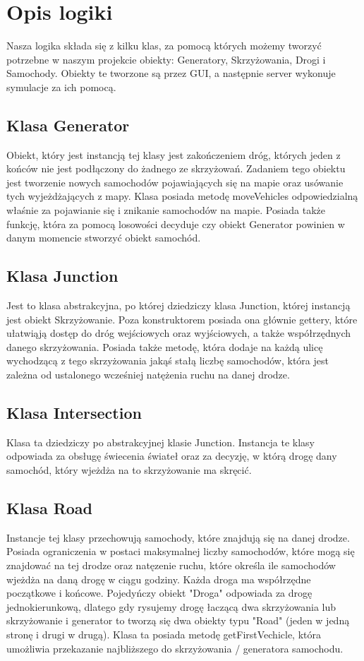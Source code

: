 \documentclass{article}
\begin{document}
\section{Opis logiki}
    Nasza logika składa się z kilku klas, za pomocą których możemy tworzyć potrzebne w naszym projekcie obiekty: Generatory, Skrzyżowania, Drogi i Samochody. Obiekty te tworzone są przez GUI, a następnie server wykonuje symulacje za ich pomocą.

\subsection{Klasa Generator}
    Obiekt, który jest instancją tej klasy jest zakończeniem dróg, których jeden z końców nie jest podłączony do żadnego ze skrzyżowań. Zadaniem tego obiektu jest tworzenie nowych samochodów pojawiających się na mapie oraz usówanie tych wyjeżdżających z mapy. Klasa posiada metodę moveVehicles odpowiedzialną właśnie za pojawianie się i znikanie samochodów na mapie. Posiada także funkcję, która za pomocą losowości decyduje czy obiekt Generator powinien w danym momencie stworzyć obiekt samochód.

\subsection{Klasa Junction}
    Jest to klasa abstrakcyjna, po której dziedziczy klasa Junction, której instancją jest obiekt Skrzyżowanie. Poza konstruktorem posiada ona głównie gettery, które ułatwiąją dostęp do dróg wejściowych oraz wyjściowych, a także współrzędnych danego skrzyżowania. Posiada także metodę, która dodaje na każdą ulicę wychodzącą z tego skrzyżowania jakąś stałą liczbę samochodów, która jest zależna od ustalonego wcześniej natężenia ruchu na danej drodze.

\subsection{Klasa Intersection}
    Klasa ta dziedziczy po abstrakcyjnej klasie Junction. Instancja te klasy odpowiada za obsługę świecenia świateł oraz za decyzję, w którą drogę dany samochód, który wjeżdża na to skrzyżowanie ma skręcić. 

\subsection{Klasa Road}
    Instancje tej klasy przechowują samochody, które znajdują się na danej drodze. Posiada ograniczenia w postaci maksymalnej liczby samochodów, które mogą się znajdować na tej drodze oraz natęzenie ruchu, które określa ile samochodów wjeżdża na daną drogę w ciągu godziny. Każda droga ma współrzędne początkowe i końcowe. Pojedyńczy obiekt "Droga" odpowiada za drogę jednokierunkową, dlatego gdy rysujemy drogę łaczącą dwa skrzyżowania lub skrzyżowanie i generator to tworzą się dwa obiekty typu "Road" (jeden w jedną stronę i drugi w drugą). Klasa ta posiada metodę getFirstVechicle, która umożliwia przekazanie najbliższego do skrzyżowania / generatora samochodu.
\end{document}
